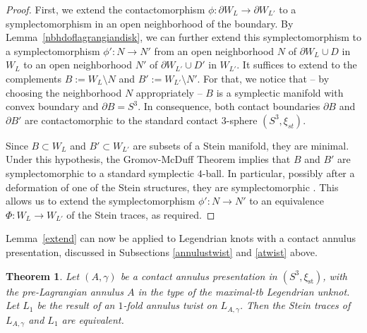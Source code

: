 \documentclass[11pt]{amsart} %
\newcommand{\xist}{\xi_{\mathrm{st}}}
\theoremstyle{plain}
\newtheorem{thm}[Theorem]{Theorem}
\theoremstyle{definition}
\begin{document}
\begin{proof}
First, we extend the contactomorphism $\phi:\partial W_L\to \partial W_{L'}$ to a symplectomorphism in an open neighborhood of the boundary. By Lemma~\ref{nbhdoflagrangiandisk}, we can further extend this symplectomorphism to a symplectomorphism $\phi':N\longrightarrow N'$ from an open neighborhood $N$ of $\partial W_L\cup D$ in $W_L$ to an open neighborhood $N'$ of $\partial W_{L'}\cup D'$ in $W_{L'}$. It suffices to extend to the complements $B:= W_L\setminus N$ and $B':=W_{L'}\setminus N'$. For that, we notice that -- by choosing the neighborhood $N$ appropriately -- $B$ is a symplectic manifold with convex boundary and $\partial B=S^3$. In consequence, both contact boundaries $\partial B$ and $\partial B'$ are contactomorphic to the standard contact $3$-sphere $(S^3,\xi_{st})$. 

Since $B \subset W_L$ and $B'\subset W_{L'}$ are subsets of a Stein manifold, they are minimal. Under this hypothesis, the Gromov-McDuff Theorem \cite{Gromov85, McDuff90} implies that $B$ and $B'$ are symplectomorphic to a standard symplectic $4$-ball. In particular, possibly after a deformation of one of the Stein structures, they are symplectomorphic \cite[Theorem~16.6]{CieliebakEliashberg12}. This allows us to extend the symplectomorphism $\phi':N\longrightarrow N'$ to an equivalence $\Phi:W_L\longrightarrow W_{L'}$ of the Stein traces, as required.
\end{proof}


Lemma~\ref{extend} can now be applied to Legendrian knots with a contact annulus presentation, discussed in Subsections \ref{annulustwist} and \ref{atwist} above.

\begin{thm}\label{extendunknot}
Let $(A,\gamma)$ be a contact annulus presentation in $(S^3,\xist)$, with the pre-Lagrangian annulus $A$ in the type of the maximal-tb Legendrian unknot. Let $L_1$ be the result of an $1$-fold annulus twist on $L_{A,\gamma}$. Then the Stein traces of $L_{A,\gamma}$ and $L_1$ are equivalent.
\end{thm}
\end{document}
